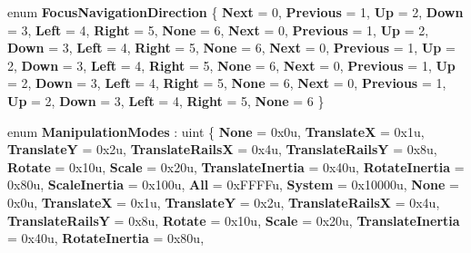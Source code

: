 \begin{DoxyCompactItemize}
enum {\bfseries Focus\+Navigation\+Direction} \{ \newline
{\bfseries Next} = 0, 
{\bfseries Previous} = 1, 
{\bfseries Up} = 2, 
{\bfseries Down} = 3, 
\newline
{\bfseries Left} = 4, 
{\bfseries Right} = 5, 
{\bfseries None} = 6, 
{\bfseries Next} = 0, 
\newline
{\bfseries Previous} = 1, 
{\bfseries Up} = 2, 
{\bfseries Down} = 3, 
{\bfseries Left} = 4, 
\newline
{\bfseries Right} = 5, 
{\bfseries None} = 6, 
{\bfseries Next} = 0, 
{\bfseries Previous} = 1, 
\newline
{\bfseries Up} = 2, 
{\bfseries Down} = 3, 
{\bfseries Left} = 4, 
{\bfseries Right} = 5, 
\newline
{\bfseries None} = 6, 
{\bfseries Next} = 0, 
{\bfseries Previous} = 1, 
{\bfseries Up} = 2, 
\newline
{\bfseries Down} = 3, 
{\bfseries Left} = 4, 
{\bfseries Right} = 5, 
{\bfseries None} = 6, 
\newline
{\bfseries Next} = 0, 
{\bfseries Previous} = 1, 
{\bfseries Up} = 2, 
{\bfseries Down} = 3, 
\newline
{\bfseries Left} = 4, 
{\bfseries Right} = 5, 
{\bfseries None} = 6
 \}
\item 
\mbox{\label{namespace_windows_1_1_u_i_1_1_xaml_1_1_input_a8c481e845e38fcfb6aa19028f4362554}} 
enum {\bfseries Manipulation\+Modes} \+: uint \{ \newline
{\bfseries None} = 0x0u, 
{\bfseries TranslateX} = 0x1u, 
{\bfseries TranslateY} = 0x2u, 
{\bfseries Translate\+RailsX} = 0x4u, 
\newline
{\bfseries Translate\+RailsY} = 0x8u, 
{\bfseries Rotate} = 0x10u, 
{\bfseries Scale} = 0x20u, 
{\bfseries Translate\+Inertia} = 0x40u, 
\newline
{\bfseries Rotate\+Inertia} = 0x80u, 
{\bfseries Scale\+Inertia} = 0x100u, 
{\bfseries All} = 0x\+F\+F\+F\+Fu, 
{\bfseries System} = 0x10000u, 
\newline
{\bfseries None} = 0x0u, 
{\bfseries TranslateX} = 0x1u, 
{\bfseries TranslateY} = 0x2u, 
{\bfseries Translate\+RailsX} = 0x4u, 
\newline
{\bfseries Translate\+RailsY} = 0x8u, 
{\bfseries Rotate} = 0x10u, 
{\bfseries Scale} = 0x20u, 
{\bfseries Translate\+Inertia} = 0x40u, 
\newline
{\bfseries Rotate\+Inertia} = 0x80u, 

\end{DoxyCompactItemize}
